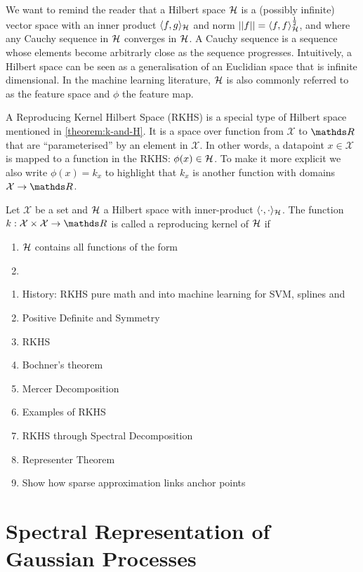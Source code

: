 We want to remind the reader that a Hilbert space ${\mathcal{H}}$ is a (possibly infinite) vector space with an inner product $\langle f, g \rangle_{{\mathcal{H}}}$ and norm $\lvert\lvert f\rvert\rvert = \langle f, f \rangle_{{\mathcal{H}}}^{\frac{1}{2}}$, and where any Cauchy sequence in ${\mathcal{H}}$ converges in ${\mathcal{H}}$. A Cauchy sequence is a sequence whose elements become arbitrarly close as the sequence progresses. Intuitively, a Hilbert space can be seen as a generalisation of an Euclidian space that is infinite dimensional. In the machine learning literature, ${\mathcal{H}}$ is also commonly referred to as the feature space and $\phi$ the feature map.

A Reproducing Kernel Hilbert Space (RKHS) is a special type of Hilbert space mentioned in \cref{theorem:k-and-H}. It is a space over function from $\mathcal{X}$ to $\Reals$ that are ``parameterised'' by an element in $\mathcal{X}$. In other words, a datapoint $x \in \mathcal{X}$ is mapped to a function in the RKHS: $\phi(x) \in {\mathcal{H}}$. To make it more explicit we also write $\phi(x) = k_x$ to highlight that $k_x$ is another function with domains $\mathcal{X} \rightarrow \Reals$.

\begin{definition}
  Let $\mathcal{X}$ be a set and ${\mathcal{H}}$ a Hilbert space with inner-product $\langle \cdot, \cdot \rangle_{{\mathcal{H}}}$. The function $k: \mathcal{X} \times \mathcal{X} \rightarrow \Reals$ is called a reproducing kernel of ${\mathcal{H}}$ if
  \begin{enumerate}
    \item ${\mathcal{H}}$ contains all functions of the form 
    \item 
  \end{enumerate}
\end{definition}

\begin{enumerate}
  \item History: RKHS pure math and into machine learning for SVM, splines and 
  \item Positive Definite and Symmetry
  \item RKHS
  \item Bochner's theorem
  \item Mercer Decomposition
  \item Examples of RKHS
  \item RKHS through Spectral Decomposition
  \item Representer Theorem
  \item Show how sparse approximation links anchor points
\end{enumerate}

\section{Spectral Representation of Gaussian Processes}
